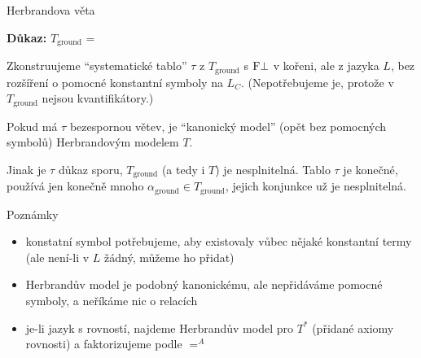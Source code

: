 \documentclass{beamer}
\begin{document}
\begin{frame}{Herbrandova věta}

    
    \textbf{Důkaz:}
        \alert{$T_\text{ground}$} = 

        \vspace{-3pt}
        
        Zkonstruujeme \alert{``systematické tablo''} $\tau$ z $T_\text{ground}$ s $\mathrm{F}\bot$ v kořeni, ale z jazyka $L$, bez rozšíření o pomocné konstantní symboly na $L_C$. (Nepotřebujeme je, protože v $T_\text{ground}$ nejsou kvantifikátory.)
        
        Pokud má $\tau$ bezespornou větev, je \alert{``kanonický model''} (opět bez pomocných symbolů) Herbrandovým modelem $T$. 
        
        Jinak je $\tau$ \alert{důkaz sporu}, $T_\text{ground}$ (a tedy i $T$) je nesplnitelná. Tablo $\tau$ je konečné, používá jen konečně mnoho $\alpha_\text{ground}\in T_\text{ground}$, jejich konjunkce už je nesplnitelná.\hfill\qedsymbol
    

\end{frame}


\begin{frame}{Poznámky}

    \begin{itemize}
        \item konstatní symbol potřebujeme, aby existovaly vůbec nějaké konstantní termy (ale není-li v $L$ žádný, můžeme ho přidat)
        \item Herbrandův model je podobný kanonickému, ale nepřidáváme pomocné symboly, a neříkáme nic o relacích
        \item je-li jazyk s rovností, najdeme Herbrandův model pro $T^*$ (přidané axiomy rovnosti) a faktorizujeme podle $=^A$
    \end{itemize}

\end{frame}
\end{document}
